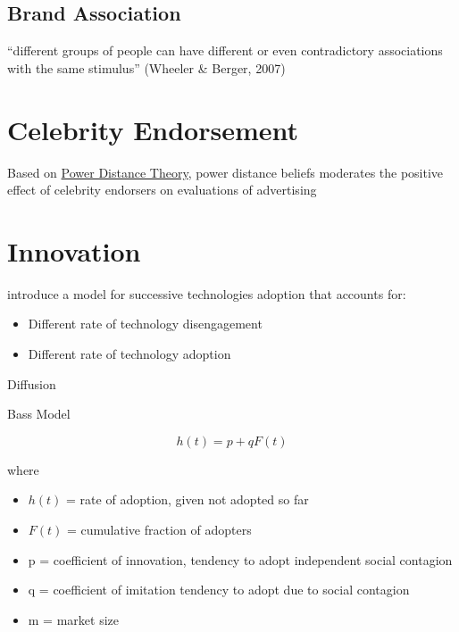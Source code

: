 \documentclass[
]{book}
\providecommand{\tightlist}{%
  \setlength{\itemsep}{0pt}\setlength{\parskip}{0pt}}
\begin{document}
\hypertarget{brand-association}{%
\section{Brand Association}\label{brand-association}}

``different groups of people can have different or even contradictory associations with the same stimulus'' (Wheeler \& Berger, 2007)

\hypertarget{celebrity-endorsement}{%
\chapter{Celebrity Endorsement}\label{celebrity-endorsement}}

Based on \href{https://bookdown.org/mike/social-theory/power-distance-theory.html}{Power Distance Theory}, power distance beliefs moderates the positive effect of celebrity endorsers on evaluations of advertising \citep{Winterich_2018}

\hypertarget{innovation}{%
\chapter{Innovation}\label{innovation}}

\citep{Chandrasekaran_2020} introduce a model for successive technologies adoption that accounts for:

\begin{itemize}
\tightlist
\item
  Different rate of technology disengagement
\item
  Different rate of technology adoption
\end{itemize}

Diffusion

Bass Model \citep{Bass_1969}

\[
h(t) = p + qF(t)
\]

where

\begin{itemize}
\item
  \(h(t)\) = rate of adoption, given not adopted so far
\item
  \(F(t)\) = cumulative fraction of adopters
\item
  p = coefficient of innovation, tendency to adopt independent social contagion
\item
  q = coefficient of imitation tendency to adopt due to social contagion
\item
  m = market size
\end{itemize}
\end{document}
